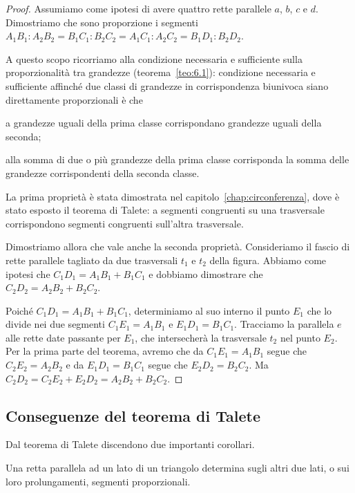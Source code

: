 \begin{proof}
Assumiamo come ipotesi di avere quattro rette parallele $a$, $b$, $c$ e $d$. Dimostriamo che sono proporzione i segmenti 
$A_1B_1 : A_2B_2 = B_1C_1 : B_2C_2 = A_1C_1 : A_2C_2 = B_1D_1 : B_2D_2$.

\begin{figure}[!htb]
	\centering	
\end{figure}

A questo scopo ricorriamo alla condizione necessaria e sufficiente sulla proporzionalità tra grandezze (teorema~\ref{teo:6.1}):
condizione necessaria e sufficiente affinché due classi di grandezze in corrispondenza biunivoca siano direttamente proporzionali è che
\begin{itemize*}
\item a grandezze uguali della prima classe corrispondano grandezze uguali della seconda;
\item alla somma di due o più grandezze della prima classe corrisponda la somma delle grandezze corrispondenti della seconda classe.
\end{itemize*}

La prima proprietà è stata dimostrata nel capitolo~\ref{chap:circonferenza}, dove è stato esposto il teorema di Talete: a segmenti congruenti su una trasversale corrispondono segmenti congruenti sull'altra trasversale.

Dimostriamo allora che vale anche la seconda proprietà.
Consideriamo il fascio di rette parallele tagliato da due trasversali $t_1$ e $t_2$ della figura.
Abbiamo come ipotesi che $C_1D_1 = A_1B_1 + B_1C_1$ e dobbiamo dimostrare che $C_2D_2 = A_2B_2 + B_2C_2$.

Poiché $C_1D_1 = A_1B_1 + B_1C_1$, determiniamo al suo interno il punto $E_1$ che lo divide nei due segmenti $C_1E_1=A_1B_1$ e $E_1D_1=B_1C_1$. Tracciamo la parallela $e$ alle rette date passante per $E_1$, che intersecherà la trasversale $t_2$ nel punto $E_2$. Per la prima parte del teorema, avremo che da $C_1E_1=A_1B_1$ segue che $C_2E_2 = A_2B_2$ e da $E_1D_1 = B_1C_1$ segue che $E_2D_2=B_2C_2$. Ma $C_2D_2=C_2E_2 + E_2D_2 = A_2B_2 + B_2C_2$.
\end{proof}

\subsection{Conseguenze del teorema di Talete}

Dal teorema di Talete discendono due importanti corollari.
\begin{corollario}\label{cor:6.1}
Una retta parallela ad un lato di un triangolo determina sugli altri due lati, o sui loro prolungamenti, segmenti proporzionali.
\end{corollario}

